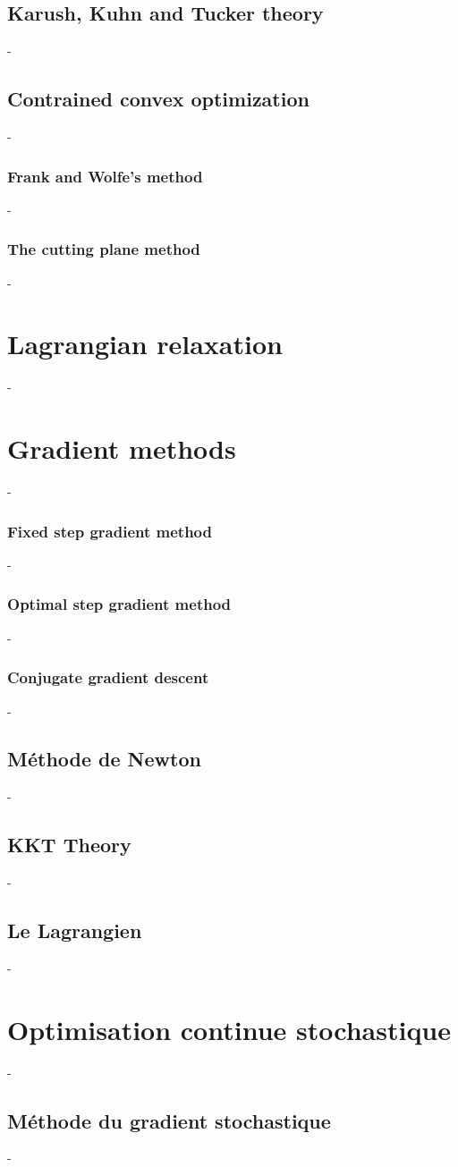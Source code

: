 \documentclass[12pt,openany,oneside]{book}
\theoremstyle{definition}
\numberwithin{definition}{section}
\numberwithin{theorem}{section}
\numberwithin{corollary}{section}
\numberwithin{proposition}{section}
\numberwithin{notation}{section}
\numberwithin{remark}{section}
\numberwithin{hypothesis}{section}
\numberwithin{example}{section}
\begin{document}
\subsection{Karush, Kuhn and Tucker theory}-
\subsection{Contrained convex optimization}-
\subsubsection{Frank and Wolfe's method}-
\subsubsection{The cutting plane method}-
\section{Lagrangian relaxation}-
\section{Gradient methods}-
\subsubsection{Fixed step gradient method}-
\subsubsection{Optimal step gradient method}-
\subsubsection{Conjugate gradient descent}-
\subsection{Méthode de Newton}-
\subsection{KKT Theory}-
\subsection{Le Lagrangien}-
\section{Optimisation continue stochastique}-
\subsection{Méthode du gradient stochastique}-
\end{document}
